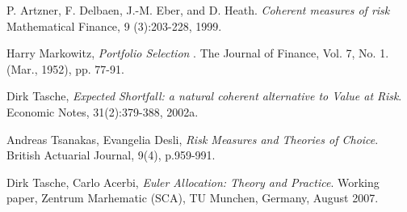 \documentclass[12pt]{article}
\theoremstyle{definition}
\begin{document}
\begin{thebibliography}{9}

P. Artzner, F. Delbaen, J.-M. Eber, and D. Heath.  \emph{Coherent measures of risk} Mathematical Finance, 9 (3):203-228, 1999.

Harry Markowitz, \emph{Portfolio Selection
}.
The Journal of Finance, Vol. 7, No. 1. (Mar., 1952), pp. 77-91.


Dirk Tasche, 
\emph{Expected Shortfall: a natural coherent alternative
to Value at Risk}.
Economic Notes, 31(2):379-388, 2002a.

Andreas Tsanakas, Evangelia Desli, \emph{Risk Measures and Theories of Choice}. British Actuarial Journal, 9(4), p.959-991.

  Dirk Tasche, Carlo Acerbi,
  \emph{Euler Allocation: Theory and Practice}.
  Working paper, Zentrum Marhematic (SCA),
TU Munchen, Germany, August 2007.

\end{thebibliography}
\end{document}
